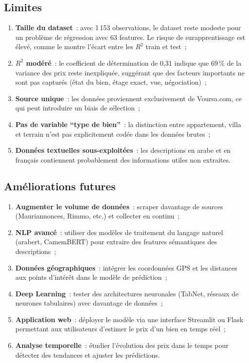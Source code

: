 \documentclass[12pt, a4paper]{article}
\begin{document}
\subsection{Limites}

\begin{enumerate}
    \item \textbf{Taille du dataset}~: avec 1\,153 observations, le dataset reste modeste pour un problème de régression avec 63 features. Le risque de surapprentissage est élevé, comme le montre l'écart entre les $R^2$ train et test~;
    \item \textbf{$R^2$ modéré}~: le coefficient de détermination de 0,31 indique que 69\,\% de la variance des prix reste inexpliquée, suggérant que des facteurs importants ne sont pas capturés (état du bien, étage exact, vue, négociation)~;
    \item \textbf{Source unique}~: les données proviennent exclusivement de Voursa.com, ce qui peut introduire un biais de sélection~;
    \item \textbf{Pas de variable ``type de bien''}~: la distinction entre appartement, villa et terrain n'est pas explicitement codée dans les données brutes~;
    \item \textbf{Données textuelles sous-exploitées}~: les descriptions en arabe et en français contiennent probablement des informations utiles non extraites.
\end{enumerate}

\subsection{Améliorations futures}

\begin{enumerate}
    \item \textbf{Augmenter le volume de données}~: scraper davantage de sources (Mauriannonces, Rimmo, etc.) et collecter en continu~;
    \item \textbf{NLP avancé}~: utiliser des modèles de traitement du langage naturel (arabert, CamemBERT) pour extraire des features sémantiques des descriptions~;
    \item \textbf{Données géographiques}~: intégrer les coordonnées GPS et les distances aux points d'intérêt dans le modèle de prédiction~;
    \item \textbf{Deep Learning}~: tester des architectures neuronales (TabNet, réseaux de neurones tabulaires) avec davantage de données~;
    \item \textbf{Application web}~: déployer le modèle via une interface Streamlit ou Flask permettant aux utilisateurs d'estimer le prix d'un bien en temps réel~;
    \item \textbf{Analyse temporelle}~: étudier l'évolution des prix dans le temps pour détecter des tendances et ajuster les prédictions.
\end{enumerate}
\end{document}
